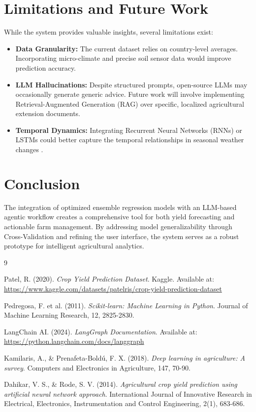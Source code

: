 \documentclass[12pt,a4paper]{article}
\begin{document}
\section{Limitations and Future Work}
While the system provides valuable insights, several limitations exist:
\begin{itemize}
    \item \textbf{Data Granularity:} The current dataset relies on country-level averages. Incorporating micro-climate and precise soil sensor data would improve prediction accuracy.
    \item \textbf{LLM Hallucinations:} Despite structured prompts, open-source LLMs may occasionally generate generic advice. Future work will involve implementing Retrieval-Augmented Generation (RAG) over specific, localized agricultural extension documents.
    \item \textbf{Temporal Dynamics:} Integrating Recurrent Neural Networks (RNNs) or LSTMs could better capture the temporal relationships in seasonal weather changes \cite{deep_learning_agri}.
\end{itemize}

\section{Conclusion}
The integration of optimized ensemble regression models with an LLM-based agentic workflow creates a comprehensive tool for both yield forecasting and actionable farm management. By addressing model generalizability through Cross-Validation and refining the user interface, the system serves as a robust prototype for intelligent agricultural analytics.

\begin{thebibliography}{9}

Patel, R. (2020). \textit{Crop Yield Prediction Dataset}. Kaggle. Available at: \url{https://www.kaggle.com/datasets/patelris/crop-yield-prediction-dataset}

Pedregosa, F. et al. (2011). \textit{Scikit-learn: Machine Learning in Python}. Journal of Machine Learning Research, 12, 2825-2830.

LangChain AI. (2024). \textit{LangGraph Documentation}. Available at: \url{https://python.langchain.com/docs/langgraph}

Kamilaris, A., \& Prenafeta-Boldú, F. X. (2018). \textit{Deep learning in agriculture: A survey}. Computers and Electronics in Agriculture, 147, 70-90.

Dahikar, V. S., \& Rode, S. V. (2014). \textit{Agricultural crop yield prediction using artificial neural network approach}. International Journal of Innovative Research in Electrical, Electronics, Instrumentation and Control Engineering, 2(1), 683-686.

\end{thebibliography}
\end{document}
